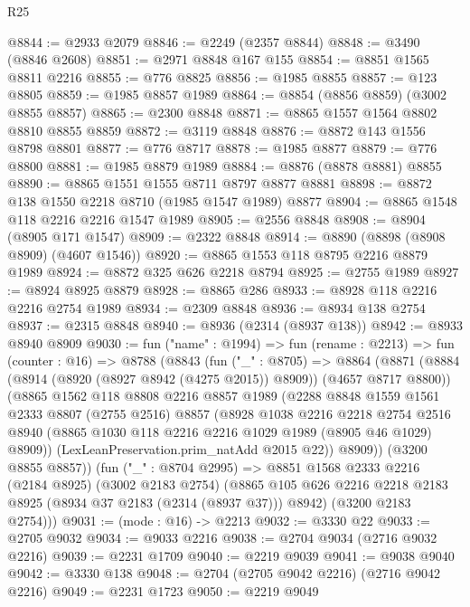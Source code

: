 \begin{lexlean}{R25}
\begin{coremodule}
@8844 := @2933 @2079
@8846 := @2249 (@2357 @8844)
@8848 := @3490 (@8846 @2608)
@8851 := @2971 @8848 @167 @155
@8854 := @8851 @1565 @8811 @2216
@8855 := @776 @8825
@8856 := @1985 @8855
@8857 := @123 @8805
@8859 := @1985 @8857 @1989
@8864 := @8854 (@8856 @8859) (@3002 @8855 @8857)
@8865 := @2300 @8848
@8871 := @8865 @1557 @1564 @8802 @8810 @8855 @8859
@8872 := @3119 @8848
@8876 := @8872 @143 @1556 @8798 @8801
@8877 := @776 @8717
@8878 := @1985 @8877
@8879 := @776 @8800
@8881 := @1985 @8879 @1989
@8884 := @8876 (@8878 @8881) @8855
@8890 := @8865 @1551 @1555 @8711 @8797 @8877 @8881
@8898 := @8872 @138 @1550 @2218 @8710 (@1985 @1547 @1989) @8877
@8904 := @8865 @1548 @118 @2216 @2216 @1547 @1989
@8905 := @2556 @8848
@8908 := @8904 (@8905 @171 @1547)
@8909 := @2322 @8848
@8914 := @8890 (@8898 (@8908 @8909) (@4607 @1546))
@8920 := @8865 @1553 @118 @8795 @2216 @8879 @1989
@8924 := @8872 @325 @626 @2218 @8794
@8925 := @2755 @1989
@8927 := @8924 @8925 @8879
@8928 := @8865 @286
@8933 := @8928 @118 @2216 @2216 @2754 @1989
@8934 := @2309 @8848
@8936 := @8934 @138 @2754
@8937 := @2315 @8848
@8940 := @8936 (@2314 (@8937 @138))
@8942 := @8933 @8940 @8909
@9030 := fun ("name" : @1994) =>
  fun (rename : @2213) =>
  fun (counter : @16) =>
  @8788
    (@8843
      (fun ("_" : @8705) =>
      @8864
        (@8871
          (@8884 (@8914 (@8920 (@8927 @8942 (@4275 @2015)) @8909)) (@4657 @8717 @8800))
          (@8865
            @1562
            @118
            @8808
            @2216
            @8857
            @1989
            (@2288
              @8848
              @1559
              @1561
              @2333
              @8807
              (@2755 @2516)
              @8857
              (@8928
                @1038
                @2216
                @2218
                @2754
                @2516
                @8940
                (@8865 @1030 @118 @2216 @2216 @1029 @1989 (@8905 @46 @1029) @8909))
              (LexLeanPreservation.prim_natAdd @2015 @22))
            @8909))
        (@3200 @8855 @8857))
      (fun ("_" : @8704 @2995) =>
      @8851
        @1568
        @2333
        @2216
        (@2184 @8925)
        (@3002 @2183 @2754)
        (@8865 @105 @626 @2216 @2218 @2183 @8925 (@8934 @37 @2183 (@2314 (@8937 @37))) @8942)
        (@3200 @2183 @2754)))
@9031 := (mode : @16) -> @2213
@9032 := @3330 @22
@9033 := @2705 @9032
@9034 := @9033 @2216
@9038 := @2704 @9034 (@2716 @9032 @2216)
@9039 := @2231 @1709
@9040 := @2219 @9039
@9041 := @9038 @9040
@9042 := @3330 @138
@9048 := @2704 (@2705 @9042 @2216) (@2716 @9042 @2216)
@9049 := @2231 @1723
@9050 := @2219 @9049

\end{coremodule}
\end{lexlean}
